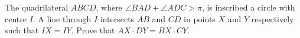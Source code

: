 The quadrilateral $ABCD$, where $\angle BAD+\angle ADC>\pi$, is inscribed a circle with centre $I$. A line through $I$ intersects $AB$ and $CD$ in points $X$ and $Y$ respectively such that $IX=IY$. Prove that $AX\cdot DY=BX\cdot CY$.